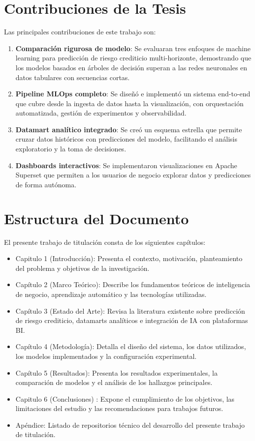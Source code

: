 \section{Contribuciones de la Tesis}
Las principales contribuciones de este trabajo son:

\begin{enumerate}
    \item \textbf{Comparación rigurosa de modelo}: Se evaluaran tres enfoques de machine learning para predicción de riesgo crediticio multi-horizonte, demostrando que los modelos basados en árboles de decisión superan a las redes neuronales en datos tabulares con secuencias cortas.
    \item \textbf{Pipeline MLOps completo}: Se diseñó e implementó un sistema end-to-end que cubre desde la ingesta de datos hasta la visualización, con orquestación automatizada, gestión de experimentos y observabilidad.
    \item \textbf{Datamart analítico integrado}: Se creó un esquema estrella que permite cruzar datos históricos con predicciones del modelo, facilitando el análisis exploratorio y la toma de decisiones.
    \item \textbf{Dashboards interactivos}: Se implementaron visualizaciones en Apache Superset que permiten a los usuarios de negocio explorar datos y predicciones de forma autónoma.
\end{enumerate}

\section{Estructura del Documento}
El presente trabajo de titulación consta de los siguientes capítulos:

\begin{itemize}
    \item {Capitulo 1 (Introducción)}: Presenta el contexto, motivación, planteamiento del problema y objetivos de la investigación.
    \item {Capítulo 2 (Marco Teórico)}: Describe los fundamentos teóricos de inteligencia de negocio, aprendizaje automático y las tecnologías utilizadas.
    \item {Capítulo 3 (Estado del Arte)}: Revisa la literatura existente sobre predicción de riesgo crediticio, datamarts analíticos e integración de IA con plataformas BI.
    \item {Capítulo 4 (Metodología)}: Detalla el diseño del sistema, los datos utilizados, los modelos implementados y la configuración experimental.
    \item {Capítulo 5 (Resultados)}: Presenta los resultados experimentales, la comparación de modelos y el análisis de los hallazgos principales.
    \item {Capitulo 6 (Conclusiones) }: Expone el cumplimiento de los objetivos, las limitaciones del estudio y las recomendaciones para trabajos futuros.
    \item{Apéndice}: Listado de repositorios técnico del desarrollo del presente trabajo de titulación. 
\end{itemize}
